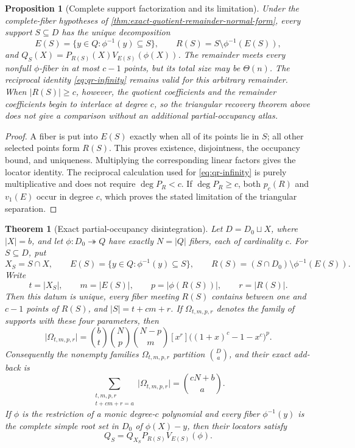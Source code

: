 \documentclass[11pt,a4paper]{amsart}
\numberwithin{equation}{section}
\newtheorem{theorem}{Theorem}[section]
\newtheorem{proposition}[proposition]{Proposition}
\theoremstyle{remark}
\newcommand{\abs}[1]{\lvert #1\rvert}
\begin{document}
\begin{proposition}[Complete support factorization and its limitation]
\label{prop:complete-support-factorization}
Under the complete-fiber hypotheses of
\cref{thm:exact-quotient-remainder-normal-form}, every support
\(S\subseteq D\) has the unique decomposition
\[
 E(S)=\{y\in Q:\phi^{-1}(y)\subseteq S\},\qquad
 R(S)=S\setminus\phi^{-1}(E(S)),
 \tag{QR5a}\label{eq:complete-support-factorization}
\]
and
\(Q_S(X)=P_{R(S)}(X)V_{E(S)}(\phi(X))\).  The remainder meets every
nonfull \(\phi\)-fiber in at most \(c-1\) points, but its total size may
be \(\Theta(n)\).  The reciprocal identity \eqref{eq:qr-infinity} remains
valid for this arbitrary remainder.  When \(\abs{R(S)}\ge c\), however,
the quotient coefficients and the remainder coefficients begin to
interlace at degree \(c\), so the triangular recovery theorem above does
not give a comparison without an additional partial-occupancy atlas.
\end{proposition}

\begin{proof}
A fiber is put into \(E(S)\) exactly when all of its points lie in \(S\);
all other selected points form \(R(S)\).  This proves existence,
disjointness, the occupancy bound, and uniqueness.  Multiplying the
corresponding linear factors gives the locator identity.  The reciprocal
calculation used for \eqref{eq:qr-infinity} is purely multiplicative and
does not require \(\deg P_R<c\).  If \(\deg P_R\ge c\), both
\(p_c(R)\) and \(v_1(E)\) occur in degree \(c\), which proves the stated
limitation of the triangular separation.
\end{proof}

\begin{theorem}[Exact partial-occupancy disintegration]
\label{thm:exact-partial-occupancy}
Let \(D=D_0\sqcup X\), where \(\abs X=b\), and let
\(\phi:D_0\twoheadrightarrow Q\) have exactly \(N=\abs Q\) fibers, each
of cardinality \(c\).  For \(S\subseteq D\), put
\[
 X_S=S\cap X,\qquad
 E(S)=\{y\in Q:\phi^{-1}(y)\subseteq S\},\qquad
 R(S)=(S\cap D_0)\setminus\phi^{-1}(E(S)).
\]
Write
\[
 t=\abs{X_S},\qquad m=\abs{E(S)},\qquad
 p=\abs{\phi(R(S))},\qquad r=\abs{R(S)}.
\]
Then this datum is unique, every fiber meeting \(R(S)\) contains between
one and \(c-1\) points of \(R(S)\), and \(\abs S=t+cm+r\).  If
\(\Omega_{t,m,p,r}\) denotes the family of supports with these four
parameters, then
\[
 \abs{\Omega_{t,m,p,r}}
 =\binom bt\binom Np\binom{N-p}m
   [x^r]\bigl((1+x)^c-1-x^c\bigr)^p.                 \tag{PO1}
\]
Consequently the nonempty families \(\Omega_{t,m,p,r}\) partition
\(\binom Da\), and their exact add-back is
\[
 \sum_{\substack{t,m,p,r\\t+cm+r=a}}\abs{\Omega_{t,m,p,r}}
 =\binom{cN+b}{a}.                                   \tag{PO2}
\]
If \(\phi\) is the restriction of a monic degree-\(c\) polynomial and
every fiber \(\phi^{-1}(y)\) is the complete simple root set in \(D_0\)
of \(\phi(X)-y\), then their locators satisfy
\[
             Q_S=Q_{X_S}P_{R(S)}V_{E(S)}(\phi).
\]
\end{theorem}
\end{document}
